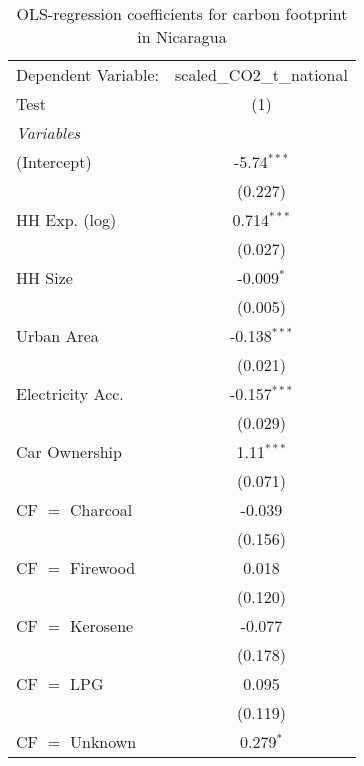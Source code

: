 
\begin{table}[htbp!]
   \centering
   \small
   \begin{adjustbox}{width = 1\textwidth, max height = 0.95\textheight, center}
      \begin{threeparttable}[b]
         \caption{\label{tab:OLS_2_NIC} OLS-regression coefficients for carbon footprint in Nicaragua}
         \begin{tabular}{lc}
            \tabularnewline \midrule \midrule
            Dependent Variable: & scaled\_CO2\_t\_national\\     
            Test                & (1)\\  
            \midrule
            \emph{Variables}\\
            (Intercept)         & -5.74$^{***}$\\   
                                & (0.227)\\   
            HH Exp. (log)       & 0.714$^{***}$\\   
                                & (0.027)\\   
            HH Size             & -0.009$^{*}$\\   
                                & (0.005)\\   
            Urban Area          & -0.138$^{***}$\\   
                                & (0.021)\\   
            Electricity Acc.    & -0.157$^{***}$\\   
                                & (0.029)\\   
            Car Ownership       & 1.11$^{***}$\\   
                                & (0.071)\\   
            CF $=$ Charcoal     & -0.039\\   
                                & (0.156)\\   
            CF $=$ Firewood     & 0.018\\   
                                & (0.120)\\   
            CF $=$ Kerosene     & -0.077\\   
                                & (0.178)\\   
            CF $=$ LPG          & 0.095\\   
                                & (0.119)\\   
            CF $=$ Unknown      & 0.279$^{*}$\\   

\end{tabular}
\end{threeparttable}
\end{adjustbox}
\end{table}
